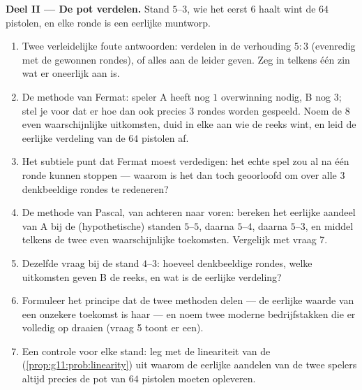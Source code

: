 \begin{problem}
\medskip
\noindent\textbf{Deel II --- De pot verdelen.}
Stand $5$--$3$, wie het eerst $6$ haalt wint de $64$ pistolen, en elke ronde
is een eerlijke muntworp.
\begin{enumerate}[resume]
  \item Twee verleidelijke foute antwoorden: verdelen in de verhouding
        $5 : 3$ (evenredig met de gewonnen rondes), of alles aan de leider
        geven. Zeg in telkens één zin wat er oneerlijk aan is.
  \item De methode van Fermat: speler A heeft nog $1$ overwinning nodig, B
        nog $3$; stel je voor dat er hoe dan ook precies $3$ rondes worden
        gespeeld. Noem de $8$ even waarschijnlijke uitkomsten, duid in elke
        aan wie de reeks wint, en leid de eerlijke verdeling van de $64$
        pistolen af.
  \item Het subtiele punt dat Fermat moest verdedigen: het echte spel zou al
        na één ronde kunnen stoppen --- waarom is het dan toch geoorloofd om
        over alle $3$ denkbeeldige rondes te redeneren?
  \item De methode van Pascal, van achteren naar voren: bereken het eerlijke
        aandeel van A bij de (hypothetische) standen $5$--$5$, daarna
        $5$--$4$, daarna $5$--$3$, en middel telkens de twee even
        waarschijnlijke toekomsten. Vergelijk met vraag 7.
  \item Dezelfde vraag bij de stand $4$--$3$: hoeveel denkbeeldige rondes,
        welke uitkomsten geven B de reeks, en wat is de eerlijke verdeling?
  \item Formuleer het principe dat de twee methoden delen --- de eerlijke
        waarde van een onzekere toekomst is haar \emph{}
        --- en noem twee moderne bedrijfstakken die er volledig op draaien
        (vraag 5 toont er een).
  \item Een controle voor elke stand: leg met de lineariteit van de
         (\cref{prop:g11:prob:linearity}) uit waarom de
        eerlijke aandelen van de twee spelers altijd precies de pot van $64$
        pistolen moeten opleveren.
\end{enumerate}


\end{problem}
